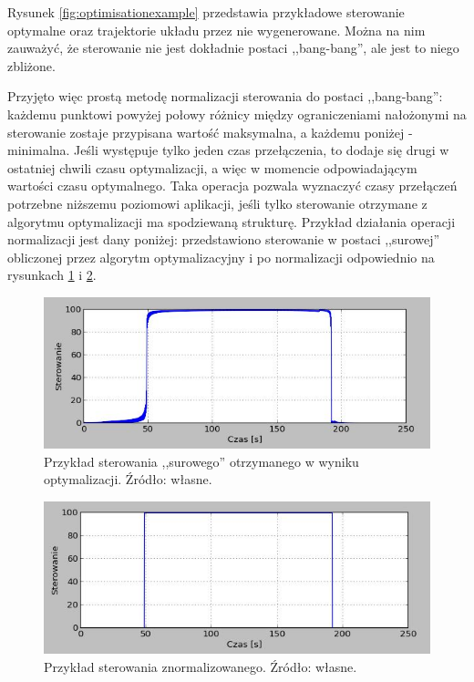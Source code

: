 Rysunek \ref{fig:optimisationexample} przedstawia przykładowe sterowanie optymalne oraz trajektorie układu przez nie wygenerowane. Można na nim zauważyć, że sterowanie nie jest dokładnie postaci ,,bang-bang'', ale jest to niego zbliżone.

Przyjęto więc prostą metodę normalizacji sterowania do postaci ,,bang-bang'': każdemu punktowi powyżej połowy różnicy między ograniczeniami nałożonymi na sterowanie zostaje przypisana wartość maksymalna, a każdemu poniżej - minimalna. Jeśli występuje tylko jeden czas przełączenia, to dodaje się drugi w ostatniej chwili czasu optymalizacji, a więc w momencie odpowiadającym wartości czasu optymalnego.
Taka operacja pozwala wyznaczyć czasy przełączeń potrzebne niższemu poziomowi aplikacji, jeśli tylko sterowanie otrzymane z algorytmu optymalizacji ma spodziewaną strukturę. Przykład działania operacji normalizacji jest dany poniżej: przedstawiono sterowanie w postaci ,,surowej'' obliczonej przez algorytm optymalizacyjny i po normalizacji odpowiednio na rysunkach \ref{fig:ctrl-raw-example} i \ref{fig:ctrl-normalised-example}.

\begin{figure}[ht]
    \centering
    \includegraphics[width=\textwidth]{Grafika/ctrl_30_30_30-20_25_20-raw}
    \caption{Przykład sterowania ,,surowego'' otrzymanego w wyniku optymalizacji. Źródło: własne.}
    \label{fig:ctrl-raw-example}
\end{figure}

\begin{figure}[ht]
    \centering
    \includegraphics[width=\textwidth]{Grafika/ctrl_30_30_30-20_25_20-normalised}
    \caption{Przykład sterowania znormalizowanego. Źródło: własne.}
    \label{fig:ctrl-normalised-example}
\end{figure}

